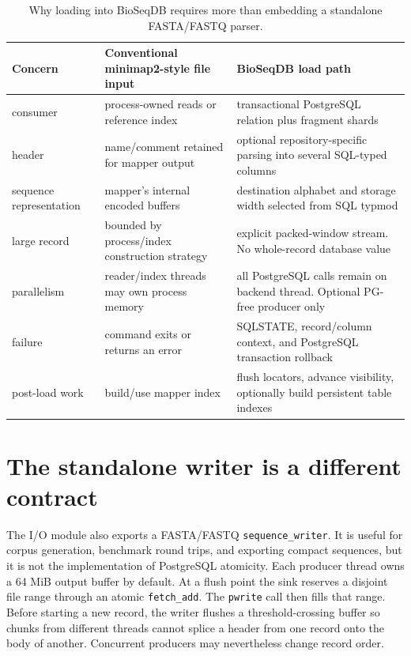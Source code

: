 \begin{table}[htbp]
\centering
\small
\begin{tabular}{p{}p{}p{}}
\toprule
\textbf{Concern} & \textbf{Conventional minimap2-style file input} &
\textbf{BioSeqDB load path}\\
\midrule
consumer &
process-owned reads or reference index &
transactional PostgreSQL relation plus fragment shards\\
header &
name/comment retained for mapper output &
optional repository-specific parsing into several SQL-typed columns\\
sequence representation &
mapper's internal encoded buffers &
destination alphabet and storage width selected from SQL typmod\\
large record &
bounded by process/index construction strategy &
explicit packed-window stream. No whole-record database value\\
parallelism &
reader/index threads may own process memory &
all PostgreSQL calls remain on backend thread. Optional PG-free producer only\\
failure &
command exits or returns an error &
SQLSTATE, record/column context, and PostgreSQL transaction rollback\\
post-load work &
build/use mapper index &
flush locators, advance visibility, optionally build persistent table indexes\\
\bottomrule
\end{tabular}
\caption{Why loading into BioSeqDB requires more than embedding a standalone
\mbox{FASTA/FASTQ} parser.}
\label{tab:io-minimap2-comparison}
\end{table}

\section{The standalone writer is a different contract}
\label{sec:io-writer}

The I/O module also exports a FASTA/FASTQ \texttt{sequence\_writer}.  It is
useful for corpus generation, benchmark round trips, and exporting compact
sequences, but it is not the implementation of PostgreSQL atomicity.
Each producer thread owns a 64 MiB output buffer by default.  At a flush point
the sink reserves a disjoint file range through an atomic
\texttt{fetch\_add}. The \texttt{pwrite} call then fills that range. Before
starting a new record, the writer flushes a threshold-crossing buffer so chunks
from different threads cannot splice a header from one record onto the body of
another.  Concurrent producers may nevertheless change record order.

